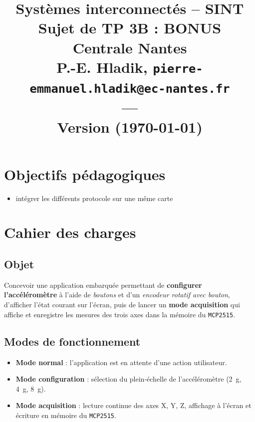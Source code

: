 \documentclass[11pt]{paper}
\title{{\Large Systèmes interconnectés -- SINT }\\
\vspace{-0.4em}
{\large Sujet de TP 3B : BONUS}\\
{\small Centrale Nantes}\\
\small P.-E. Hladik, \small{\texttt{pierre-emmanuel.hladik@ec-nantes.fr}}\\
---\\
{\scriptsize  Version \version (\today)}\\
}
\begin{document}
\maketitle


  \section{Objectifs pédagogiques}


\begin{itemize}
	\item intégrer les différents protocole sur une même carte
\end{itemize}


\section{Cahier des charges}

\subsection{Objet}
Concevoir une application embarquée permettant de \textbf{configurer l'accéléromètre} à l'aide de \textit{boutons} et d'un \textit{encodeur rotatif avec bouton}, d'afficher l'état courant sur l'écran, puis de lancer un \textbf{mode acquisition} qui affiche et enregistre les mesures des trois axes dans la mémoire du \texttt{MCP2515}.

\subsection{Modes de fonctionnement}
\begin{itemize}
  \item \textbf{Mode normal} : l'application est en attente d'une action utilisateur.
  \item \textbf{Mode configuration} : sélection du plein-échelle de l'accéléromètre (\SI{2}{g}, \SI{4}{g}, \SI{8}{g}).
  \item \textbf{Mode acquisition} : lecture continue des axes X, Y, Z, affichage à l'écran et écriture en mémoire du \texttt{MCP2515}.
\end{itemize}
\end{document}
